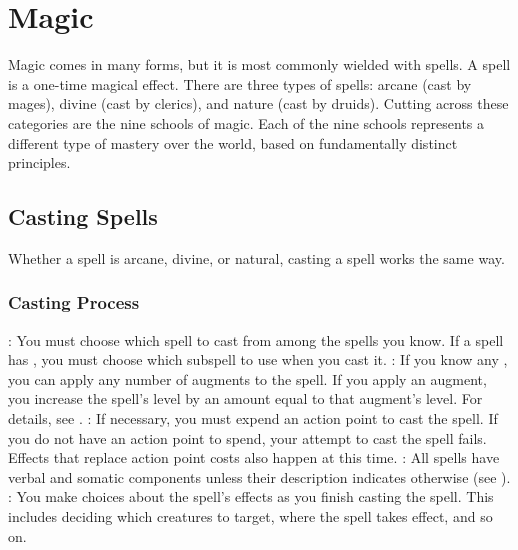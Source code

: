 \chapter{Magic}\label{Magic}

Magic comes in many forms, but it is most commonly wielded with spells.
A spell is a one-time magical effect.
There are three types of spells: arcane (cast by mages), divine (cast by clerics), and nature (cast by druids). Cutting across these categories are the nine schools of magic.
Each of the nine schools represents a different type of mastery over the world, based on fundamentally distinct principles.

\section{Casting Spells}\label{Casting Spells}
    Whether a spell is arcane, divine, or natural, casting a spell works the same way.

    \subsection{Casting Process}

        \begin{itemize}
            : You must choose which spell to cast from among the spells you know.
                If a spell has , you must choose which subspell to use when you cast it.
            : If you know any , you can apply any number of augments to the spell.
                If you apply an augment, you increase the spell's level by an amount equal to that augment's level.
                For details, see .
            : If necessary, you must expend an action point to cast the spell.
                If you do not have an action point to spend, your attempt to cast the spell fails.
                Effects that replace action point costs also happen at this time.
            : All spells have verbal and somatic components unless their description indicates otherwise (see ).
            : You make choices about the spell's effects as you finish casting the spell.
                This includes deciding which creatures to target, where the spell takes effect, and so on.
        \end{itemize}


